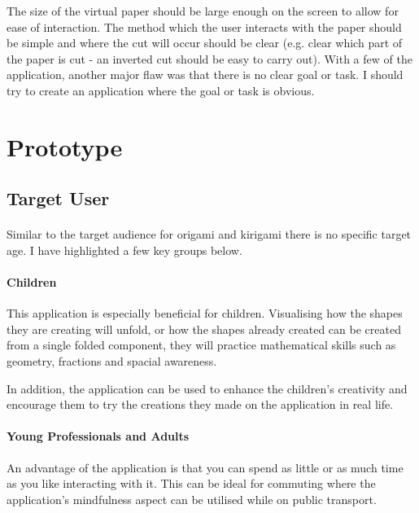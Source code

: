 \documentclass[11pt]{article}
\begin{document}
            The size of the virtual paper should be large enough on the screen to allow for ease of interaction. The method which the user interacts with the paper should be simple and where the cut will occur should be clear (e.g. clear which part of the paper is cut - an inverted cut should be easy to carry out). 
            With a few of the application, another major flaw was that there is no clear goal or task. I should try to create an application where the goal or task is obvious.


\newpage
\section{Prototype}

    \subsection{Target User}
    
            \paragraph{}
            Similar to the target audience for origami and kirigami there is no specific target age. I have highlighted a few key groups below. 
            
            \paragraph{Children}
            This application is especially beneficial for children. Visualising how the shapes they are creating will unfold, or how the shapes already created can be created from a single folded component, they will practice mathematical skills such as geometry, fractions and spacial awareness.
            
            In addition, the application can be used to enhance the children's creativity and encourage them to try the creations they made on the application in real life. 
            
            \paragraph{Young Professionals and Adults}
            An advantage of the application is that you can spend as little or as much time as you like interacting with it. This can be ideal for commuting where the application's mindfulness aspect can be utilised while on public transport.
\end{document}
